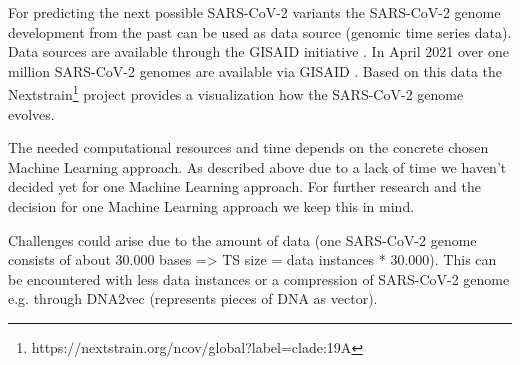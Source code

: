 For predicting the next possible SARS-CoV-2 variants the SARS-CoV-2 genome development from the past can be used as data source (genomic time series data). Data sources are available through the GISAID initiative \cite{Gisaid2021}. In April 2021 over one million SARS-CoV-2 genomes are available via GISAID \cite{Maxmen2021}. Based on this data the Nextstrain\footnote{https://nextstrain.org/ncov/global?label=clade:19A} project provides a visualization how the SARS-CoV-2 genome evolves.


The needed computational resources and time depends on the concrete chosen Machine Learning approach. As described above due to a lack of time we haven't decided yet for one Machine Learning approach. For further research and the decision for one Machine Learning approach we keep this in mind.

Challenges could arise due to the amount of data (one SARS-CoV-2 genome consists of about 30.000 bases => TS size = data instances * 30.000). This can be encountered with less data instances or a compression of SARS-CoV-2 genome e.g. through DNA2vec \cite{Ng2017} (represents pieces of \ac{DNA} as vector).

\newpage
